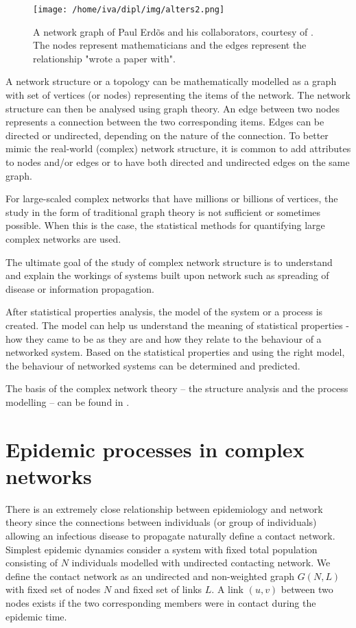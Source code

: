 \documentclass[times, utf8, diplomski]{fer}
\begin{document}
\begin{figure}[htp]
\centering
\texttt{[image: /home/iva/dipl/img/alters2.png]}
\caption{A network graph of Paul Erd\~os and his collaborators, courtesy of \citet{krebs}. The nodes represent mathematicians and the edges represent the relationship "wrote a paper with".}
\label{net}
\end{figure}
A network structure or a topology can be mathematically modelled as a graph with set of vertices (or nodes) representing the items of the network. The network structure can then be analysed using graph theory. An edge between two nodes represents a connection between the two corresponding items. Edges can be directed or undirected, depending  on the nature of the connection.  To better mimic the real-world (complex) network structure, it is common to add attributes to nodes and/or edges or to have both directed and undirected edges on the same graph.

For large-scaled complex networks that have millions or billions of vertices, the study in the form of traditional graph theory is not sufficient or sometimes possible. When this is the case, the statistical methods  for quantifying large complex networks are used. 

The ultimate goal of the study of complex network structure is to understand and explain the workings of systems built upon network such as spreading of disease or information propagation.

After statistical properties analysis, the model of the system or a process  is created. The model can help us understand the meaning of statistical properties - how they came to be as they are and how they relate to the behaviour of a networked system. Based on the statistical properties and using the right model, the behaviour of networked systems can be determined and predicted.

The basis of the complex network theory -- the structure  analysis and the process modelling -- can be found in \citet{Newman03thestructure}.

\section{Epidemic processes in complex networks}
There is an extremely close relationship between epidemiology and network theory since the connections between individuals (or group of individuals) allowing an infectious disease to propagate naturally define a contact network. Simplest epidemic dynamics consider a system with fixed total population consisting of $N$ individuals modelled with undirected contacting network. We define the contact network as an undirected and non-weighted graph $G(N, L)$ with fixed set of nodes $N$ and fixed set of links $L$. A link $(u, v)$ between two nodes exists if the two corresponding members were in contact during the epidemic time.
\end{document}
